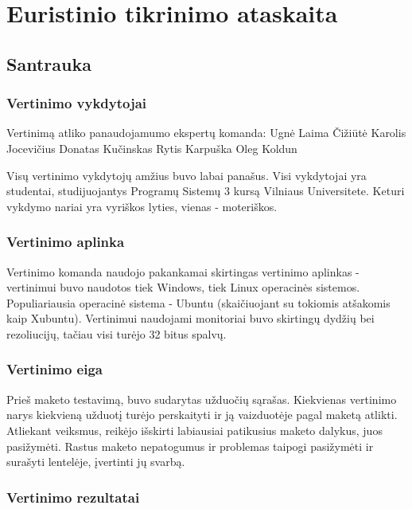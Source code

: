 \section{Euristinio tikrinimo ataskaita}

\subsection{Santrauka}

	\subsubsection{Vertinimo vykdytojai}

	Vertinimą atliko panaudojamumo ekspertų komanda:
		Ugnė Laima Čižiūtė
		Karolis Jocevičius
		Donatas Kučinskas
		Rytis Karpuška
		Oleg Koldun
	
	Visų vertinimo vykdytojų amžius buvo labai panašus.
	Visi vykdytojai yra studentai, studijuojantys Programų Sistemų 3 kursą Vilniaus Universitete.
	Keturi vykdymo nariai yra vyriškos lyties, vienas - moteriškos.

	\subsubsection{Vertinimo aplinka}

	Vertinimo komanda naudojo pakankamai skirtingas vertinimo aplinkas - vertinimui buvo naudotos tiek Windows, tiek Linux operacinės sistemos.
	Populiariausia operacinė sistema - Ubuntu (skaičiuojant su tokiomis atšakomis kaip Xubuntu).
	Vertinimui naudojami monitoriai buvo skirtingų dydžių bei rezoliucijų, tačiau visi turėjo 32 bitus spalvų.

	\subsubsection{Vertinimo eiga}

	Prieš maketo testavimą, buvo sudarytas užduočių sąrašas.
	Kiekvienas vertinimo narys kiekvieną užduotį turėjo perskaityti ir ją vaizduotėje pagal maketą atlikti.
	Atliekant veiksmus, reikėjo išskirti labiausiai patikusius maketo dalykus, juos pasižymėti.
	Rastus maketo nepatogumus ir problemas taipogi pasižymėti ir surašyti lentelėje, įvertinti jų svarbą.

	\subsubsection{Vertinimo rezultatai}


